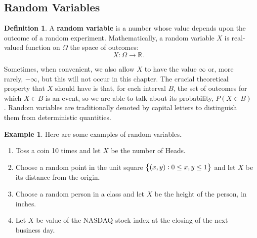\documentclass[12pt,a4paper]{article}
\theoremstyle{definition}
\newtheorem{example}{Example}[section]
\theoremstyle{definition}
\newtheorem*{definition}{Definition}
\theoremstyle{definition}
\theoremstyle{definition}
\theoremstyle{remark}
\theoremstyle{definition}
\begin{document}
\subsection{Random Variables}
\begin{tcolorbox}[colback=white]
	\begin{definition}
		A \textbf{random variable} is a number whose value depends upon the outcome of a random experiment. Mathematically, a random variable $X$ is real-valued function on $\Omega$ the space of outcomes: \[
		X:\Omega\to\mathbb{R}.
		\]
	\end{definition}
\end{tcolorbox} Sometimes, when convenient, we also allow $X$ to have the value $\infty$ or, more rarely, $-\infty$, but this will not occur in this chapter. The crucial theoretical property that $X$ should have is that, for each interval $B$, the set of outcomes for which $X\in B$ is an event, so we are able to talk about its probability, $P(X\in B)$. Random variables are traditionally denoted by capital letters to distinguish them from deterministic quantities.
\\
\begin{example}
	Here are some examples of random variables.\begin{enumerate}
		\item Toss a coin 10 times and let $X$ be the number of Heads.
		\item Choose a random point in the unit square $\set{(x,y):0\leq x,y\leq1}$ and let $X$ be its distance from the origin.
		\item Choose a random person in a class and let $X$ be the height of the person, in inches.
		\item Let $X$ be value of the NASDAQ stock index at the closing of the next business day.
	\end{enumerate}
\end{example}
\end{document}
